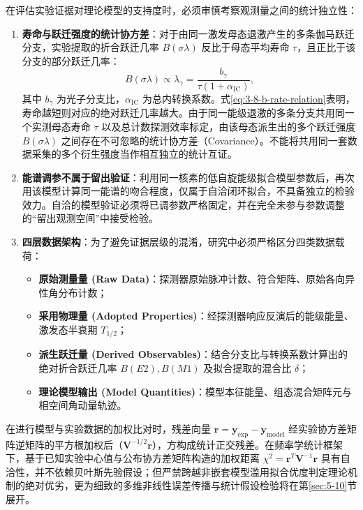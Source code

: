 在评估实验证据对理论模型的支持度时，必须审慎考察观测量之间的统计独立性：
\begin{enumerate}
\item \textbf{寿命与跃迁强度的统计协方差}：对于由同一激发母态退激产生的多条伽马跃迁分支，实验提取的折合跃迁几率 $B(\sigma\lambda)$ 反比于母态平均寿命 $\tau$，且正比于该分支的部分跃迁几率：
\begin{equation}\label{eq:3-8-b-rate-relation}
B(\sigma\lambda) \propto \lambda_{\gamma} = \frac{b_\gamma}{\tau (1 + \alpha_{\mathrm{IC}})} ,
\end{equation}
其中 $b_\gamma$ 为光子分支比，$\alpha_{\mathrm{IC}}$ 为总内转换系数。式\eqref{eq:3-8-b-rate-relation}表明，寿命越短则对应的绝对跃迁几率越大。由于同一能级退激的多条分支共用同一个实测母态寿命 $\tau$ 以及总计数探测效率标定，由该母态派生出的多个跃迁强度 $B(\sigma\lambda)$ 之间存在不可忽略的统计协方差（Covariance）。不能将共用同一套数据采集的多个衍生强度当作相互独立的统计互证。
\item \textbf{能谱调参不属于留出验证}：利用同一核素的低自旋能级拟合模型参数后，再次用该模型计算同一能谱的吻合程度，仅属于自洽闭环拟合，不具备独立的检验效力。自洽的模型验证必须将已调参数严格固定，并在完全未参与参数调整的“留出观测空间”中接受检验。
\item \textbf{四层数据架构}：为了避免证据层级的混淆，研究中必须严格区分四类数据载荷：
\begin{itemize}
\item \textbf{原始测量量 (Raw Data)}：探测器原始脉冲计数、符合矩阵、原始各向异性角分布计数；
\item \textbf{采用物理量 (Adopted Properties)}：经探测器响应反演后的能级能量、激发态半衰期 $T_{1/2}$；
\item \textbf{派生跃迁量 (Derived Observables)}：结合分支比与转换系数计算出的绝对折合跃迁几率 $B(E2), B(M1)$ 及拟合提取的混合比 $\delta$；
\item \textbf{理论模型输出 (Model Quantities)}：模型本征能量、组态混合矩阵元与相空间角动量轨迹。
\end{itemize}
\end{enumerate}

在进行模型与实验数据的加权比对时，残差向量 $\mathbf{r} = \mathbf{y}_{\mathrm{exp}} - \mathbf{y}_{\mathrm{model}}$ 经实验协方差矩阵逆矩阵的平方根加权后（$\mathbf{V}^{-1/2} \mathbf{r}$），方构成统计正交残差。在频率学统计框架下，基于已知实验中心值与公布协方差矩阵构造的加权距离 $\chi^2 = \mathbf{r}^T \mathbf{V}^{-1} \mathbf{r}$ 具有自洽性，并不依赖贝叶斯先验假设；但严禁跨越非嵌套模型滥用拟合优度判定理论机制的绝对优劣，更为细致的多维非线性误差传播与统计假设检验将在第\ref{sec:5-10}节展开。

